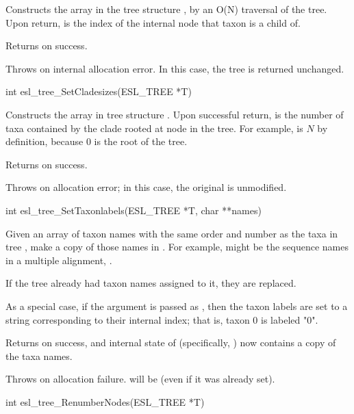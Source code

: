 \begin{sreapi}
Constructs the  array in the tree
structure , by an O(N) traversal of the tree.
Upon return,  is the index
of the internal node that taxon  is a child of.

Returns  on success.

Throws  on internal allocation error. In this case, the tree is 
returned unchanged.



\hypertarget{func:esl_tree_SetCladesizes()}
{\item[int esl\_tree\_SetCladesizes(ESL\_TREE *T)]}

Constructs the  array in tree structure
. Upon successful return,  is the
number of taxa contained by the clade rooted at node 
in the tree. For example,  is $N$ by
definition, because 0 is the root of the tree.

Returns  on success.

Throws  on allocation error; in this case, the
original  is unmodified.


\hypertarget{func:esl_tree_SetTaxonlabels()}
{\item[int esl\_tree\_SetTaxonlabels(ESL\_TREE *T, char **names)]}

Given an array of taxon names  with the
same order and number as the taxa in tree , make a
copy of those names in . For example,  might
be the sequence names in a multiple alignment,
.

If the tree already had taxon names assigned to it, they
are replaced.

As a special case, if the  argument is passed as
, then the taxon labels are set to a string
corresponding to their internal index; that is, taxon 0
is labeled "0". 

Returns  on success, and internal state of 
(specifically, ) now contains a copy
of the taxa names.

Throws  on allocation failure.  will be
 (even if it was already set).


\hypertarget{func:esl_tree_RenumberNodes()}
{\item[int esl\_tree\_RenumberNodes(ESL\_TREE *T)]}


\end{sreapi}
